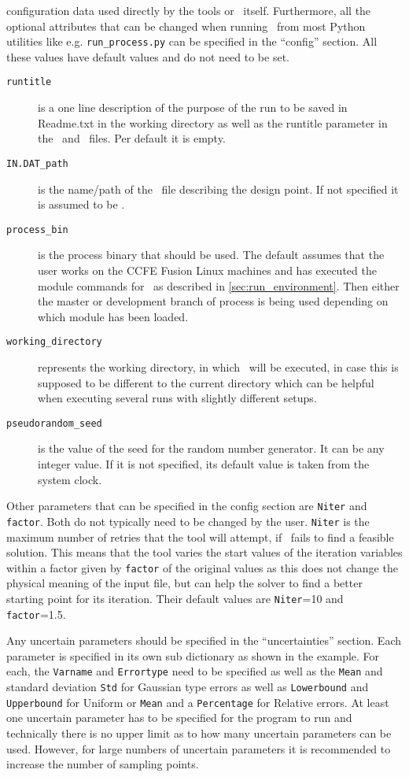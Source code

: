 configuration data used directly by the tools or \process\
itself. Furthermore, all the optional attributes that can be changed when
running \process\ from most Python utilities like
e.g. \texttt{run\_process.py} can be specified in the ``config'' section. All
these values have default values and do not need to be set.
\begin{description}
\item[\texttt{runtitle}] is a one line description of the purpose of the run
  to be saved in Readme.txt in the working directory as well as the runtitle
  parameter in the \outdat\ and \mfile\ files. Per default it is empty.
\item[\texttt{IN.DAT\_path}] is the name/path of the \indat\ file describing
  the design point. If not specified it is assumed to be \indat.
\item[\texttt{process\_bin}] is the process binary that should be used. The
  default assumes that the user works on the CCFE Fusion Linux machines and
  has executed the module commands for \process\ as described in
  \ref{sec:run_environment}. Then either the master or development branch of
  process is being used depending on which module has been loaded.
\item[\texttt{working\_directory}] represents the working directory, in which
  \process\ will be executed, in case this is supposed to be different to the
  current directory which can be helpful when executing several runs with
  slightly different setups.
\item[\texttt{pseudorandom\_seed}] is the value of the seed for the random
  number generator. It can be any integer value. If it is not specified, its
  default value is taken from the system clock.
\end{description}

Other parameters that can be specified in the config section are
\texttt{Niter} and \texttt{factor}. Both do not typically need to be changed
by the user. \texttt{Niter} is the maximum number of retries that the tool
will attempt, if \process\ fails to find a feasible solution. This means that
the tool varies the start values of the iteration variables within a factor
given by \texttt{factor} of the original values as this does not change the
physical meaning of the input file, but can help the solver to find a better
starting point for its iteration. Their default values are \texttt{Niter}=10
and \texttt{factor}=1.5.

Any uncertain parameters should be specified in the ``uncertainties''
section. Each parameter is specified in its own sub dictionary as shown in the
example. For each, the \texttt{Varname} and \texttt{Errortype} need to be
specified as well as the \texttt{Mean} and standard deviation \texttt{Std} for
Gaussian type errors as well as \texttt{Lowerbound} and \texttt{Upperbound}
for Uniform or \texttt{Mean} and a \texttt{Percentage} for Relative errors. At
least one uncertain parameter has to be specified for the program to run and
technically there is no upper limit as to how many uncertain parameters can be
used. However, for large numbers of uncertain parameters it is recommended to
increase the number of sampling points.

